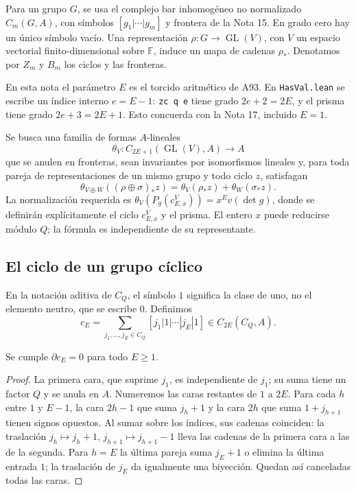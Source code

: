 Para un grupo $G$, se usa el complejo bar inhomogéneo no normalizado $C_m(G,A)$, con símbolos $[g_1|\cdots|g_m]$ y frontera de la Nota 15. En grado cero hay un único símbolo vacío. Una representación $\rho:G\to\operatorname{GL}(V)$, con $V$ un espacio vectorial finito-dimensional sobre $\mathbb F$, induce un mapa de cadenas $\rho_*$. Denotamos por $Z_m$ y $B_m$ los ciclos y las fronteras.

En esta nota el parámetro $E$ es el torcido aritmético de A93. En \texttt{HasVal.lean} se escribe un índice interno $e=E-1$: \texttt{zc q e} tiene grado $2e+2=2E$, y el prisma tiene grado $2e+3=2E+1$. Esto concuerda con la Nota 17, incluido $E=1$.

Se busca una familia de formas $A$-lineales
\begin{equation}
 \theta_V:C_{2E+1}(\operatorname{GL}(V),A)\longrightarrow A
 \label{eq:ev-familia}
\end{equation}
que se anulen en fronteras, sean invariantes por isomorfismos lineales y, para toda pareja de representaciones de un mismo grupo y todo ciclo $z$, satisfagan
\begin{equation}
 \theta_{V\oplus W}((\rho\oplus\sigma)_*z)
 =\theta_V(\rho_*z)+\theta_W(\sigma_*z).
 \label{eq:ev-aditividad-objetivo}
\end{equation}
La normalización requerida es $\theta_V(P_g(c_{E,x}^{V}))=x^Ev(\det g)$, donde se definirán explícitamente el ciclo $c_{E,x}^V$ y el prisma. El entero $x$ puede reducirse módulo $Q$; la fórmula es independiente de su representante.

\subsection{El ciclo de un grupo cíclico}

En la notación aditiva de $C_Q$, el símbolo $1$ significa la clase de uno, no el elemento neutro, que se escribe $0$. Definimos
\begin{equation}
 c_E=\sum_{j_1,\ldots,j_E\in C_Q}
       [j_1|1|\cdots|j_E|1]\in C_{2E}(C_Q,A).
 \label{eq:ev-ciclo}
\end{equation}

\begin{lema}
\label{lem:ev-ciclo}
Se cumple $\partial c_E=0$ para todo $E\ge1$.
\end{lema}
\begin{proof}
La primera cara, que suprime $j_1$, es independiente de $j_1$; su suma tiene un factor $Q$ y se anula en $A$. Numeremos las caras restantes de $1$ a $2E$. Para cada $h$ entre $1$ y $E-1$, la cara $2h-1$ que suma $j_h+1$ y la cara $2h$ que suma $1+j_{h+1}$ tienen signos opuestos. Al sumar sobre los índices, sus cadenas coinciden: la traslación $j_h\mapsto j_h+1$, $j_{h+1}\mapsto j_{h+1}-1$ lleva las cadenas de la primera cara a las de la segunda. Para $h=E$ la última pareja suma $j_E+1$ o elimina la última entrada $1$; la traslación de $j_E$ da igualmente una biyección. Quedan así canceladas todas las caras.
\end{proof}

